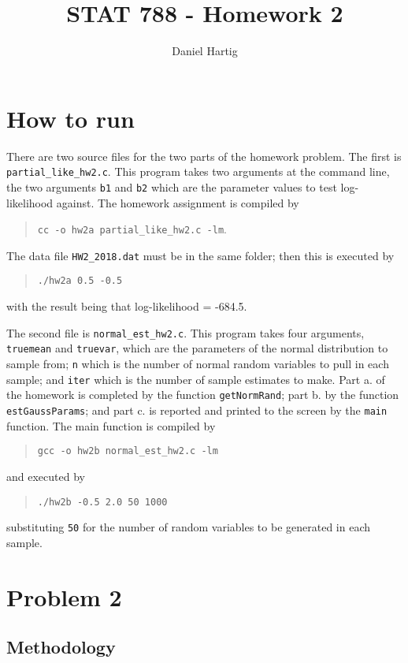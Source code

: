 \documentclass{article}
\title{STAT 788 - Homework 2}
\author{Daniel Hartig}
\begin{document}
\maketitle

\section{How to run}

There are two source files for the two parts of the homework problem. The first is \verb!partial_like_hw2.c!. This program takes two arguments at the command line, the two arguments \verb!b1! and \verb!b2! which are the parameter values to test log-likelihood against. The homework assignment is compiled by
\begin{quote}\verb!cc -o hw2a partial_like_hw2.c -lm!.\end{quote}
The data file \verb!HW2_2018.dat! must be in the same folder; then this is executed by 
\begin{quote}\verb!./hw2a 0.5 -0.5!\end{quote}
with the result being that log-likelihood = -684.5.

The second file is \verb!normal_est_hw2.c!. This program takes four arguments, \verb!truemean! and \verb!truevar!, which are the parameters of the normal distribution to sample from; \verb!n! which is the number of normal random variables to pull in each sample; and \verb!iter! which is the number of sample estimates to make. Part a. of the homework is completed by the function \verb!getNormRand!; part b. by the function \verb!estGaussParams!; and part c. is reported and printed to the screen by the \verb!main! function. The main function is compiled by 
\begin{quote}\verb!gcc -o hw2b normal_est_hw2.c -lm!\end{quote}

and executed by 
\begin{quote}\verb!./hw2b -0.5 2.0 50 1000!\end{quote}
substituting \verb!50! for the number of random variables to be generated in each sample.



\section{Problem 2}
\subsection{Methodology}
\end{document}
